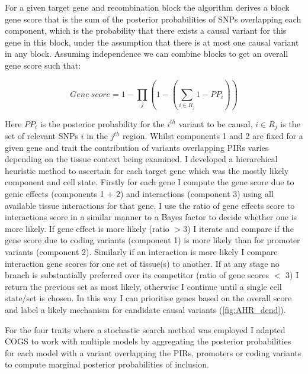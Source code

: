 \documentclass[a4paper,11pt]{report}
\begin{document}
For a given target gene and recombination block the algorithm derives a block gene score that is the sum of the posterior probabilities of SNPs overlapping each component, which is the probability that there exists a causal variant for this gene in this block, under the assumption that there is at most one causal variant in any block. Assuming independence we can combine blocks to get an overall gene score such that:

\begin{equation}
  Gene\ score = 1- \prod_j  \left(1-\left(\sum_{i \in R_j} 1-PP_i \right) \right)
  \label{eqn:cogs_score}
\end{equation}

Here $PP_i$ is the posterior probability for the $i^{th}$ variant to be causal, $i \in R_j$ is the set of relevant SNPs $i$ in the $j^{th}$ region. Whilst components 1 and 2 are fixed for a given gene and trait the contribution of variants overlapping PIRs varies depending on the tissue context being examined. I developed a hierarchical heuristic method to ascertain for each target gene which was the mostly likely component and cell state. Firstly for each gene I compute the gene score due to genic effects (components 1 $+$ 2) and interactions (component 3) using all available tissue interactions for that gene. I use the ratio of gene effects score to interactions score in a similar manner to a Bayes factor to decide whether one is more likely. If gene effect is more likely (ratio $>$3) I iterate and compare if the gene score due to coding variants (component 1) is more likely than for promoter variants (component 2). Similarly if an interaction is more likely I compare interaction gene scores for one set of tissue(s) to another. If at any stage no branch is substantially preferred over its competitor (ratio of gene scores $<$ 3) I return the previous set as most likely, otherwise I continue until a single cell state/set is chosen. In this way I can prioritise genes based on the overall score and label a likely mechanism for candidate causal variants (\ref{fig:AHR_dend}).

For the four traits where a stochastic search method was employed I adapted COGS to work with multiple models by aggregating the posterior probabilities for each model with a variant overlapping the PIRs, promoters or coding variants to compute marginal posterior probabilities of inclusion.
\end{document}
